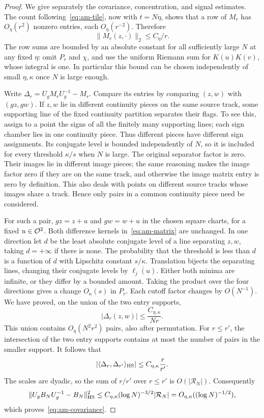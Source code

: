 \begin{proof}
We give separately the covariance, concentration, and signal estimates.
The count following~\eqref{eq:am-tile}, now with $t=N\eta$, shows that a
row of $M_r$ has $O_\eta(r^2)$ nonzero entries, each
$O_\eta(r^{-2})$.  Therefore
\begin{equation}\label{eq:am-row-norms}
 \|M_r(z,\cdot)\|_2\le C_\eta/r.
\end{equation}
The row sums are bounded by an absolute constant for all sufficiently large
$N$ at any fixed $\eta$: omit $P_r$ and $\chi$, and use the uniform
Riemann sum for $K(u)K(v)$, whose integral is one.  In particular this bound
can be chosen independently of small $\eta,\kappa$ once $N$ is large enough.

Write $\Delta_r=U_gM_rU_g^{-1}-M_r$.  Compare its entries by comparing
$(z,w)$ with $(gz,gw)$.  If $z,w$ lie in different continuity pieces on the
same source track, some supporting line of the fixed continuity partition
separates their flags.  To see this, assign to a point the signs of all the
finitely many supporting lines; each sign chamber lies in one continuity
piece.  Thus different pieces have different sign assignments.  Its
conjugate level is bounded independently of $N$, so it is included for every
threshold $\kappa/s$ when $N$ is large.  The original separator factor is
zero.  Their images lie in different image pieces; the same reasoning makes
the image factor zero if they are on the same track, and otherwise the
image matrix entry is zero by definition.  This also deals with points
on different source tracks whose images share a track.  Hence only pairs
in a common continuity piece need be considered.

For such a pair, $gz=z+u$ and $gw=w+u$ in the chosen square charts, for a
fixed $u\in\mathcal O^2$.  Both difference kernels in~\eqref{eq:am-matrix} are
unchanged.  In one direction let $d$ be the least absolute conjugate level
of a line separating $z,w$, taking $d=+\infty$ if there is none.  The
probability that the threshold is less than $d$ is a function of $d$ with
Lipschitz constant $s/\kappa$.  Translation bijects the separating lines,
changing their conjugate levels by $\overline{\ell_j(u)}$.  Either both minima are infinite,
or they differ by a bounded amount.  Taking the product over the four
directions gives a change $O_\kappa(s)$ in $P_r$.  Each cutoff factor changes
by $O(N^{-1})$.  We have proved, on the union of the two entry supports,
\begin{equation}\label{eq:am-entry-change}
 |\Delta_r(z,w)|\le \frac{C_{\eta,\kappa}}{Nr}.
\end{equation}
This union contains $O_\eta(N^2r^2)$ pairs, also after permutation.
For $r\le r'$, the intersection of the two entry supports contains at most
the number of pairs in the smaller support.  It follows that
\[
 |\langle\Delta_r,\Delta_{r'}\rangle_{\mathrm{HS}}|
 \le C_{\eta,\kappa}\frac{r}{r'}.
\]
The scales are dyadic, so the sum of $r/r'$ over $r\le r'$ is
$O(|\mathcal R_N|)$.  Consequently
\[
 \|U_gB_NU_g^{-1}-B_N\|_{\mathrm{HS}}^2
 \le C_{\eta,\kappa}(\log N)^{-3/2}|\mathcal R_N|
 =O_{\eta,\kappa}((\log N)^{-1/2}),
\]
which proves~\eqref{eq:am-covariance}.


\end{proof}
